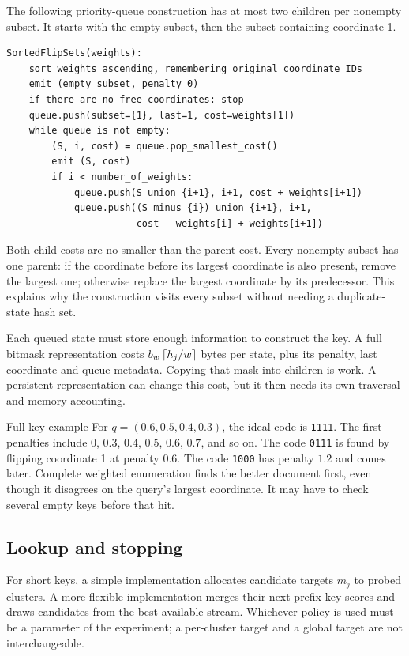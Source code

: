 The following priority-queue construction has at most two children per nonempty subset.
It starts with the empty subset, then the subset containing coordinate 1.
\par\noindent\begin{minipage}{\linewidth}
\begin{lstlisting}[caption={A complete sorted-subset stream, not one chain of flips.}]
SortedFlipSets(weights):
    sort weights ascending, remembering original coordinate IDs
    emit (empty subset, penalty 0)
    if there are no free coordinates: stop
    queue.push(subset={1}, last=1, cost=weights[1])
    while queue is not empty:
        (S, i, cost) = queue.pop_smallest_cost()
        emit (S, cost)
        if i < number_of_weights:
            queue.push(S union {i+1}, i+1, cost + weights[i+1])
            queue.push((S minus {i}) union {i+1}, i+1,
                       cost - weights[i] + weights[i+1])
\end{lstlisting}
\end{minipage}\par

Both child costs are no smaller than the parent cost. Every nonempty subset has one parent:
if the coordinate before its largest coordinate is also present, remove the largest one;
otherwise replace the largest coordinate by its predecessor. This explains why the construction
visits every subset without needing a duplicate-state hash set.

Each queued state must store enough information to construct the key. A full bitmask representation costs
$b_w\left\lceil h_j/w\right\rceil$ bytes per state, plus its penalty, last coordinate and queue metadata.
Copying that mask into children is work. A persistent representation can change this cost,
but it then needs its own traversal and memory accounting.

\begin{examplebox}{Full-key example}
For $q=(0.6,0.5,0.4,0.3)$, the ideal code is \texttt{1111}. The first penalties include
$0$, $0.3$, $0.4$, $0.5$, $0.6$, $0.7$, and so on. The code \texttt{0111} is found by flipping
coordinate 1 at penalty $0.6$. The code \texttt{1000} has penalty $1.2$ and comes later.
Complete weighted enumeration finds the better document first, even though it disagrees on
the query's largest coordinate. It may have to check several empty keys before that hit.
\end{examplebox}

\subsection{Lookup and stopping}
For short keys, a simple implementation allocates candidate targets $m_j$ to probed clusters.
A more flexible implementation merges their next-prefix-key scores and draws candidates from
the best available stream. Whichever policy is used must be a parameter of the experiment;
a per-cluster target and a global target are not interchangeable.

